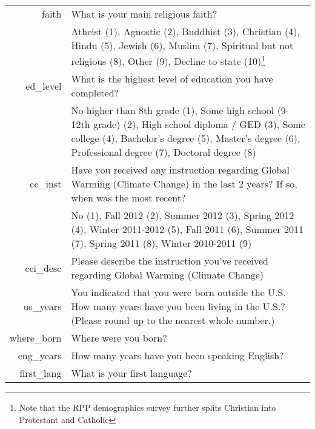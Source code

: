 \begin{longtabu}{>{\sffamily}rX}
faith & What is your main religious faith? \\
 & Atheist (1), Agnostic (2), Buddhist (3), Christian (4), Hindu (5), Jewish (6),
Muslim (7), Spiritual but not religious (8), Other (9), Decline to state
(10)\footnote{Note that the RPP demographics survey further splits Christian
    into Protestant and Catholic} \\

ed_level & What is the highest level of education you have completed? \\
 & No higher than 8th grade (1), Some high school (9-12th grade) (2), High
 school diploma / GED (3), Some college (4), Bachelor's degree (5), Master's
 degree (6), Professional degree (7), Doctoral degree (8) \\

cc_inst & Have you received any instruction regarding Global Warming (Climate
Change) in the last 2 years? If so, when was the most recent? \\
 & No (1), Fall 2012 (2), Summer 2012 (3), Spring 2012 (4), Winter 2011-2012
 (5), Fall  2011 (6), Summer 2011 (7), Spring  2011 (8), Winter 2010-2011 (9) \\

cci_desc & Please describe the instruction you've received regarding Global
Warming (Climate Change) \\

us_years & You indicated that you were born outside the U.S. How many years have
you been living in the U.S.? (Please round up to the nearest whole number.) \\

where_born & Where were you born? \\

eng_years & How many years have you been speaking English? \\

first_lang & What is your first language? \\
\end{longtabu}

